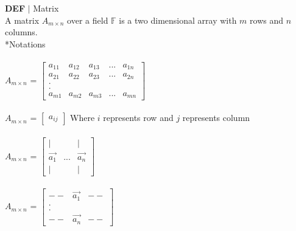 \documentclass [12pt]{article}
\begin{document}
\begin{framed}
\noindent\textbf{DEF} $|$ Matrix\\
A matrix $A_{m\times n}$ over a field $\mathbb{F}$ is a two dimensional array with $m$ rows and $n$ columns.\\
*Notations\\\\
\indent$A_{m\times n}$ = 
$\begin{bmatrix}
a_{11}&a_{12}&a_{13}&...&a_{1n}\\
a_{21}&a_{22}&a_{23}&...&a_{2n}\\
.\\
.\\
a_{m1}&a_{m2}&a_{m3}&...&a_{mn}
\end{bmatrix}$\\\\

$A_{m\times n}$ = 
$\begin{bmatrix}
a_{ij}
\end{bmatrix}$
\indent Where $i$ represents row and $j$ represents column\\\\

$A_{m\times n}$ = 
$\begin{bmatrix}
|& &|\\
\overrightarrow{a_1}&...&\overrightarrow{a_n}\\
|& &|
\end{bmatrix}$\\\\

$A_{m\times n}$ = 
$\begin{bmatrix}
--&\overrightarrow{a_1}&--\\
.\\
.\\
--&\overrightarrow{a_n}&--
\end{bmatrix}$\\\\
\end{framed}
\end{document}
